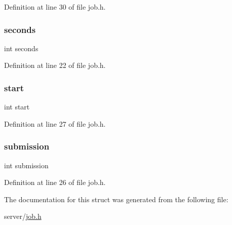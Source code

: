Definition at line 30 of file job.\+h.

\mbox{\label{structjob_a77bd4f876bdc3afed5acdd936f775d34}} 
\subsubsection{\texorpdfstring{seconds}{seconds}}
{\footnotesize\ttfamily int seconds}



Definition at line 22 of file job.\+h.

\mbox{\label{structjob_a37722a150250e2a5a98e5e0d11e53449}} 
\subsubsection{\texorpdfstring{start}{start}}
{\footnotesize\ttfamily int start}



Definition at line 27 of file job.\+h.

\mbox{\label{structjob_a672ef807e8a5c395641b197cd1606fdc}} 
\subsubsection{\texorpdfstring{submission}{submission}}
{\footnotesize\ttfamily int submission}



Definition at line 26 of file job.\+h.



The documentation for this struct was generated from the following file\+:\begin{DoxyCompactItemize}
\item 
server/\hyperlink{job_8h}{job.\+h}\end{DoxyCompactItemize}
